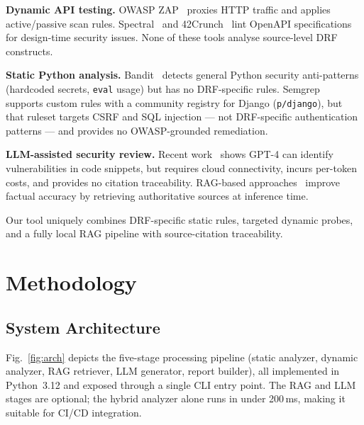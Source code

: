 \documentclass[conference]{IEEEtran}
\begin{document}
\textbf{Dynamic API testing.} OWASP ZAP~\cite{owaspzap} proxies HTTP traffic
and applies active/passive scan rules. Spectral~\cite{spectral} and
42Crunch~\cite{fortytwoCrunch} lint OpenAPI specifications for design-time
security issues. None of these tools analyse source-level DRF constructs.

\textbf{Static Python analysis.} Bandit~\cite{bandit} detects general Python
security anti-patterns (hardcoded secrets, \texttt{eval} usage) but has no
DRF-specific rules. Semgrep~\cite{semgrep} supports custom rules with a
community registry for Django (\texttt{p/django}), but that ruleset targets
CSRF and SQL injection — not DRF-specific authentication patterns — and
provides no OWASP-grounded remediation.

\textbf{LLM-assisted security review.} Recent work~\cite{llmvuln2023} shows
GPT-4 can identify vulnerabilities in code snippets, but requires cloud
connectivity, incurs per-token costs, and provides no citation traceability.
RAG-based approaches~\cite{rag2020} improve factual accuracy by retrieving
authoritative sources at inference time.

Our tool uniquely combines DRF-specific static rules, targeted dynamic probes,
and a fully local RAG pipeline with source-citation traceability.

\section{Methodology}

\subsection{System Architecture}

Fig.~\ref{fig:arch} depicts the five-stage processing pipeline (static
analyzer, dynamic analyzer, RAG retriever, LLM generator, report builder),
all implemented in Python~3.12 and exposed through a single CLI entry point.
The RAG and LLM stages are optional; the hybrid analyzer alone runs in under
200\,ms, making it suitable for CI/CD integration.
\end{document}

